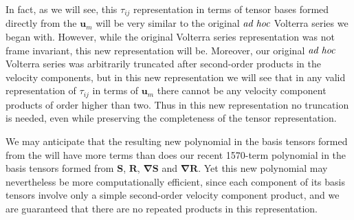 In fact, as we will see, this $\tau_{ij}$ representation in terms of tensor bases formed directly from the $\mathbf{u}_m$  will be very similar to the original $\emph{ad hoc}$ Volterra series we began with.  However, while the original Volterra series representation was not frame invariant, this new representation will be. Moreover, our original $\emph{ad hoc}$ Volterra series was arbitrarily truncated after second-order products in the velocity components, but in this new representation we will see that in any valid representation of $\tau_{ij}$  in terms of $\mathbf{u}_m$ there cannot be any velocity component products of order higher than two. Thus in this new representation no truncation is needed, even while preserving the completeness of the tensor representation.

We may anticipate that the resulting new polynomial in the basis tensors formed from the   will have more terms than does our recent 1570-term polynomial in the basis tensors formed from $\mathbf{S}$, $\mathbf{R}$, $\mathbf{\nabla S}$ and $\mathbf{\nabla R}$. Yet this new polynomial may nevertheless be more computationally efficient, since each component of its basis tensors involve only a simple second-order velocity component product, and we are guaranteed that there are no repeated products in this representation. 






